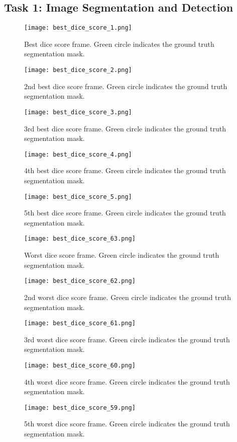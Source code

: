 \documentclass{report}
\begin{document}
\begin{appendices}

\chapter{Task 1: Image Segmentation and Detection}\label{sec:app_task1}


\begin{figure}
    \centering
    \texttt{[image: best\_dice\_score\_1.png]}
    \caption{Best dice score frame. Green circle indicates the ground truth segmentation mask.}
\end{figure}
\begin{figure}
    \centering
    \texttt{[image: best\_dice\_score\_2.png]}
    \caption{2nd best dice score frame. Green circle indicates the ground truth segmentation mask.}
\end{figure}
\begin{figure}
    \centering
    \texttt{[image: best\_dice\_score\_3.png]}
    \caption{3rd best dice score frame. Green circle indicates the ground truth segmentation mask.}
\end{figure}
\begin{figure}
    \centering
    \texttt{[image: best\_dice\_score\_4.png]}
    \caption{4th best dice score frame. Green circle indicates the ground truth segmentation mask.}
\end{figure}
\begin{figure}
    \centering
    \texttt{[image: best\_dice\_score\_5.png]}
    \caption{5th best dice score frame. Green circle indicates the ground truth segmentation mask.}
\end{figure}

\begin{figure}
    \centering
    \texttt{[image: best\_dice\_score\_63.png]}
    \caption{Worst dice score frame. Green circle indicates the ground truth segmentation mask.}
\end{figure}
\begin{figure}
    \centering
    \texttt{[image: best\_dice\_score\_62.png]}
    \caption{2nd worst dice score frame. Green circle indicates the ground truth segmentation mask.}
\end{figure}
\begin{figure}
    \centering
    \texttt{[image: best\_dice\_score\_61.png]}
    \caption{3rd worst dice score frame. Green circle indicates the ground truth segmentation mask.}
\end{figure}
\begin{figure}
    \centering
    \texttt{[image: best\_dice\_score\_60.png]}
    \caption{4th worst dice score frame. Green circle indicates the ground truth segmentation mask.}
\end{figure}
\begin{figure}
    \centering
    \texttt{[image: best\_dice\_score\_59.png]}
    \caption{5th worst dice score frame. Green circle indicates the ground truth segmentation mask.}
\end{figure}


\end{appendices}
\end{document}
